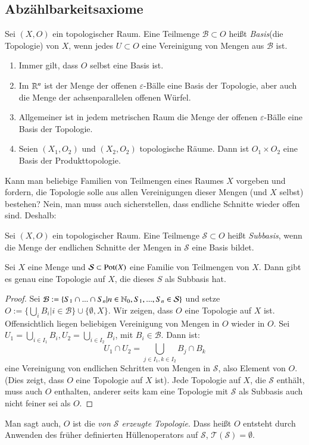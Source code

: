 \documentclass[a4paper,10pt]{scrartcl}
\newcommand{\eps}{\varepsilon}
\begin{document}
\subsection{Abzählbarkeitsaxiome}
\begin{df}
 Sei $(X,O)$ ein topologischer Raum. Eine Teilmenge $\mathcal B\subset O$ heißt \emph{Basis}(die Topologie) von $X$, wenn jedes $U\subset O$ eine Vereinigung von Mengen aus $\mathcal B$ ist.
\end{df}
\begin{exs*}
 \begin{enumerate}
  \item Immer gilt, dass $O$ selbst eine Basis ist.
  \item Im $\mathbb{R}^n$ ist der Menge der offenen $\eps$-Bälle eine Basis der Topologie, aber auch die Menge der achsenparallelen offenen Würfel.
  \item Allgemeiner ist in jedem metrischen Raum die Menge der offenen $\eps$-Bälle eine Basis der Topologie.
  \item Seien $(X_1,O_2)$ und $(X_2,O_2)$ topologische Räume. Dann ist $O_1\times O_2$ eine Basis der Produkttopologie.
\end{enumerate}
\end{exs*}
Kann man beliebige Familien von Teilmengen eines Raumes $X$ vorgeben und fordern, die Topologie solle aus allen Vereinigungen dieser Mengen (und $X$ selbst) bestehen? Nein, man muss auch sicherstellen, dass endliche Schnitte wieder offen sind. Deshalb:
\begin{df}
 Sei $(X,O)$ ein topologischer Raum. Eine Teilmenge $\mathcal S\subset O$ heißt \emph{Subbasis}, wenn die Menge der endlichen Schnitte der Mengen in $\mathcal S$ eine Basis bildet.
\end{df}
\begin{st}\label{thm:4.3}
 Sei $X$ eine Menge und $\mathcal S\subset \operatorname{Pot}(X)$  eine Familie von Teilmengen von $X$. Dann gibt es genau eine Topologie auf $X$, die dieses $S$ als Subbasis hat.
\end{st}
\begin{proof}
Sei $\mathcal B:=\{S_1\cap...\cap S_n|n\in \mathbb{N}_0, S_1,...,S_n\in \mathcal S\}$ und setze $O:=\{\bigcup_iB_i|i\in \mathcal B\} \cup\{\emptyset,X\}$.
 Wir zeigen, dass $O$ eine Topologie auf $X$ ist. Offensichtlich liegen beliebigen Vereinigung von Mengen in $O$ wieder in $O$. 
Sei $U_1=\bigcup_{i\in I_1}B_i, U_2=\bigcup_{i\in I_2}B_i$, mit $B_i\in \mathcal B$. Dann ist:
\[
 U_1\cap U_2=\bigcup\limits_{j\in I_1,k\in I_2}B_j\cap B_k
\]
eine Vereinigung von endlichen Schritten von Mengen in $\mathcal S$, also Element von $O$. (Dies zeigt, dass $O$ eine Topologie auf $X$ ist). 
Jede Topologie auf $X$, die $\mathcal S$ enthält, muss auch $O$ enthalten, anderer seits kam eine Topologie mit $\mathcal S$ als Subbasis auch nicht feiner sei als $O$.
\end{proof}
Man sagt auch, $O$ ist die \emph{von $\mathcal S$ erzeugte Topologie}. Dass heißt $O$ entsteht durch Anwenden des früher definierten
Hüllenoperators auf $\mathcal S$, $\mathcal T(\mathcal S)=\emptyset$.
\end{document}
